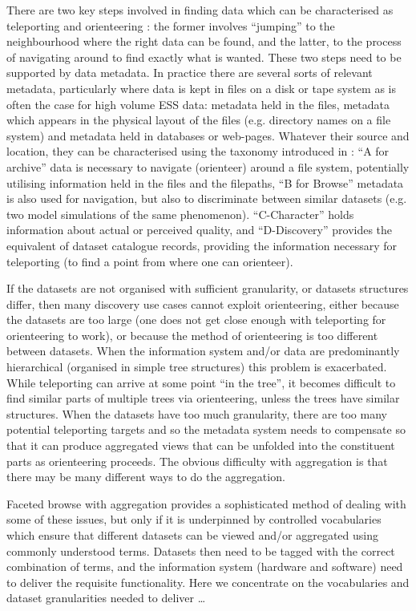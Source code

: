 \documentclass[final,1p,times,twocolumn,authoryear]{elsarticle}
\begin{document}
There are two key steps involved in finding data which can be characterised as teleporting and orienteering \citep{Teevan2004}: the former involves ``jumping'' to the neighbourhood where the right data can be found, and the latter, to the process of navigating around to find exactly what is wanted. 
These two steps need to be supported by data metadata. 
In practice there are several sorts of relevant metadata, particularly where data is kept in files on a disk or tape system as is often the case for high volume ESS data: metadata held in the files, metadata which appears in the physical layout of the files (e.g. directory names on a file system) and metadata held in databases or web-pages. 
Whatever their source and location, they can be characterised using the taxonomy introduced in \cite{LawEA09}: ``A for archive'' data is necessary to navigate (orienteer) around a file system, potentially utilising information held in the files and the filepaths, ``B for Browse'' metadata is also used for navigation, but also to discriminate between similar datasets (e.g. two model simulations of the same phenomenon). 
``C-Character'' holds information about actual or perceived quality, and ``D-Discovery'' provides the equivalent of dataset catalogue records, providing the information necessary for teleporting (to find a point from where one can orienteer).

If the datasets are not organised with sufficient granularity, or datasets structures differ, then many discovery use cases cannot exploit orienteering, either because the datasets are too large (one does not get close enough with teleporting for orienteering to work), or because the method of orienteering is too different between datasets. 
When the information system and/or data are predominantly hierarchical (organised in simple tree structures) this problem is exacerbated. While teleporting can arrive at some point ``in the tree'', it becomes difficult to find similar parts of multiple trees via orienteering, unless the trees have similar structures.
When the datasets have too much granularity, there are too many potential teleporting targets and so the metadata system needs to compensate so that it can produce aggregated views that can be unfolded into the constituent parts as orienteering proceeds.
The obvious difficulty with aggregation is that there may be many different ways to do the aggregation.

Faceted browse with aggregation provides a sophisticated method of dealing with some of these issues, but only if it is underpinned by controlled vocabularies which ensure that different datasets can be viewed and/or aggregated using commonly understood terms. 
Datasets then need to be tagged with the correct combination of terms, and the information system (hardware and software) need to deliver the requisite functionality. 
Here we concentrate on the vocabularies and dataset granularities needed to deliver \dots
\end{document}

